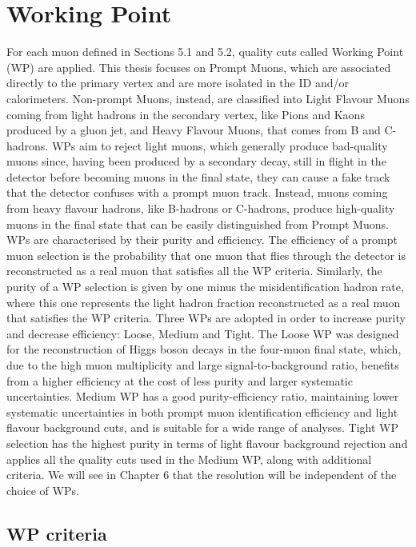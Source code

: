 \documentclass[11pt,a4paper,twoside,openright]{report}
\begin{document}
\section{Working Point}
For each muon defined in Sections 5.1 and 5.2, quality cuts called Working Point (WP) are applied. This thesis focuses on Prompt Muons, which are associated directly to the primary vertex and are more isolated in the ID and/or calorimeters. Non-prompt Muons, instead, are classified into Light Flavour Muons coming from light hadrons in the secondary vertex, like Pions and Kaons produced by a gluon jet, and Heavy Flavour Muons, that comes from B and C-hadrons. WPs aim to reject light muons, which generally produce bad-quality muons since, having been produced by a secondary decay, still in flight in the detector before becoming muons in the final state, they can cause a fake track that the detector confuses with a prompt muon track. Instead, muons coming from heavy flavour hadrons, like B-hadrons or C-hadrons, produce high-quality muons in the final state that can be easily distinguished from Prompt Muons. WPs are characterised by their purity and efficiency. The efficiency of a prompt muon selection is the probability that one muon that flies through the detector is reconstructed as a real muon that satisfies all the WP criteria. Similarly, the purity of a WP selection is given by one minus the misidentification hadron rate, where this one represents the light hadron fraction reconstructed as a real muon that satisfies the WP criteria. Three WPs are adopted in order to increase purity and decrease efficiency: Loose, Medium and Tight. The Loose WP was designed for the reconstruction of Higgs boson decays in the four-muon final state, which, due to the high muon multiplicity and large signal-to-background ratio, benefits from a higher efficiency at the cost of less purity and larger systematic uncertainties. Medium WP has a good purity-efficiency ratio, maintaining lower systematic uncertainties in both prompt muon identification efficiency and light flavour background cuts, and is suitable for a wide range of analyses. Tight WP selection has the highest purity in terms of light flavour background rejection and applies all the quality cuts used in the Medium WP, along with additional criteria. We will see in Chapter 6 that the resolution will be independent of the choice of WPs.

\subsection{WP criteria}
\end{document}
